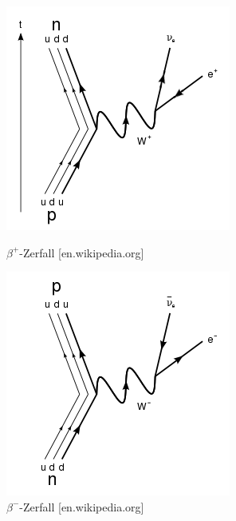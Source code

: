 \begin{figure}[H]
	\begin{minipage}{0.5\textwidth}
	\centering \includegraphics[width=\textwidth]{BilderTheorie/betaplus.png}
	\caption{$\beta^+$-Zerfall [en.wikipedia.org]}
	\end{minipage}
	\begin{minipage}{0.5\textwidth}
	\centering \includegraphics[width=\textwidth]{BilderTheorie/betaminus.png}
	\caption{$\beta^-$-Zerfall  [en.wikipedia.org]}	
	\end{minipage}
\end{figure}

